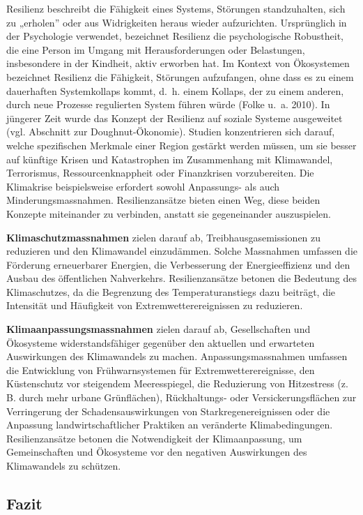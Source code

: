 \documentclass[
  nswissgerman,
  a4paper,
  openany]{book}
\begin{document}
Resilienz beschreibt die Fähigkeit eines Systems, Störungen
standzuhalten, sich zu „erholen'' oder aus Widrigkeiten heraus wieder
aufzurichten. Ursprünglich in der Psychologie verwendet, bezeichnet
Resilienz die psychologische Robustheit, die eine Person im Umgang mit
Herausforderungen oder Belastungen, insbesondere in der Kindheit, aktiv
erworben hat. Im Kontext von Ökosystemen bezeichnet Resilienz die
Fähigkeit, Störungen aufzufangen, ohne dass es zu einem dauerhaften
Systemkollaps kommt, d.~h. einem Kollaps, der zu einem anderen, durch
neue Prozesse regulierten System führen würde (Folke u.~a. 2010). In
jüngerer Zeit wurde das Konzept der Resilienz auf soziale Systeme
ausgeweitet (vgl. Abschnitt zur Doughnut-Ökonomie). Studien
konzentrieren sich darauf, welche spezifischen Merkmale einer Region
gestärkt werden müssen, um sie besser auf künftige Krisen und
Katastrophen im Zusammenhang mit Klimawandel, Terrorismus,
Ressourcenknappheit oder Finanzkrisen vorzubereiten. Die Klimakrise
beispielsweise erfordert sowohl Anpassungs- als auch
Minderungsmassnahmen. Resilienzansätze bieten einen Weg, diese beiden
Konzepte miteinander zu verbinden, anstatt sie gegeneinander
auszuspielen.

\textbf{Klimaschutz\-massnahmen} zielen darauf ab,
Treibhausgasemissionen zu reduzieren und den Klimawandel einzudämmen.
Solche Massnahmen umfassen die Förderung erneuerbarer Energien, die
Verbesserung der Energieeffizienz und den Ausbau des öffentlichen
Nahverkehrs. Resilienzansätze betonen die Bedeutung des Klimaschutzes,
da die Begrenzung des Temperaturanstiegs dazu beiträgt, die Intensität
und Häufigkeit von Extremwetterereignissen zu reduzieren.

\textbf{Klimaanpassungsmassnahmen} zielen darauf ab, Gesellschaften und
Ökosysteme widerstandsfähiger gegenüber den aktuellen und erwarteten
Auswirkungen des Klimawandels zu machen. Anpassungsmassnahmen umfassen
die Entwicklung von Frühwarnsystemen für Extremwetterereignisse, den
Küstenschutz vor steigendem Meeresspiegel, die Reduzierung von
Hitzestress (z. B. durch mehr urbane Grünflächen), Rückhaltungs- oder
Versickerungsflächen zur Verringerung der Schadensauswirkungen von
Starkregenereignissen oder die Anpassung landwirtschaftlicher Praktiken
an veränderte Klimabedingungen. Resilienzansätze betonen die
Notwendigkeit der Klimaanpassung, um Gemeinschaften und Ökosysteme vor
den negativen Auswirkungen des Klimawandels zu schützen.

\subsection{Fazit}\label{fazit}
\end{document}
